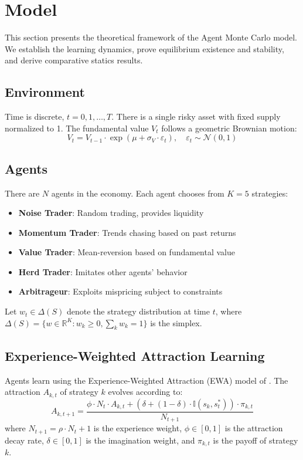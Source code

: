 \section{Model}
\label{sec:model}

This section presents the theoretical framework of the Agent Monte Carlo model. We establish the learning dynamics, prove equilibrium existence and stability, and derive comparative statics results.

\subsection{Environment}

Time is discrete, $t = 0, 1, \ldots, T$. There is a single risky asset with fixed supply normalized to 1. The fundamental value $V_t$ follows a geometric Brownian motion:
\begin{equation}
V_t = V_{t-1} \cdot \exp(\mu + \sigma_V \cdot \varepsilon_t), \quad \varepsilon_t \sim \mathcal{N}(0,1)
\end{equation}

\subsection{Agents}

There are $N$ agents in the economy. Each agent chooses from $K=5$ strategies:
\begin{itemize}
    \item \textbf{Noise Trader}: Random trading, provides liquidity
    \item \textbf{Momentum Trader}: Trends chasing based on past returns
    \item \textbf{Value Trader}: Mean-reversion based on fundamental value
    \item \textbf{Herd Trader}: Imitates other agents' behavior
    \item \textbf{Arbitrageur}: Exploits mispricing subject to constraints
\end{itemize}

Let $w_t \in \Delta(S)$ denote the strategy distribution at time $t$, where $\Delta(S) = \{w \in \mathbb{R}^K : w_k \geq 0, \sum_k w_k = 1\}$ is the simplex.

\subsection{Experience-Weighted Attraction Learning}

Agents learn using the Experience-Weighted Attraction (EWA) model of \citet{camerer1999experience}. The attraction $A_{k,t}$ of strategy $k$ evolves according to:
\begin{equation}
A_{k,t+1} = \frac{\phi \cdot N_t \cdot A_{k,t} + (\delta + (1-\delta) \cdot \mathbb{I}(s_k, s_t^*)) \cdot \pi_{k,t}}{N_{t+1}}
\end{equation}
where $N_{t+1} = \rho \cdot N_t + 1$ is the experience weight, $\phi \in [0,1]$ is the attraction decay rate, $\delta \in [0,1]$ is the imagination weight, and $\pi_{k,t}$ is the payoff of strategy $k$.

